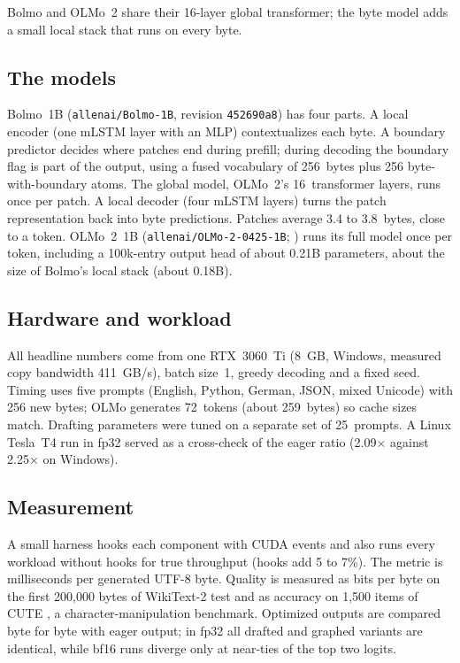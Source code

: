 \documentclass[11pt,a4paper]{article}
\newcommand{\x}{\ensuremath{\times}}
\begin{document}
Bolmo and OLMo~2 share their 16-layer global transformer; the byte model adds a small local stack that runs on every byte.

\subsection{The models}

Bolmo~1B (\texttt{allenai/Bolmo-1B}, revision \texttt{452690a8}) has four parts. A local encoder (one mLSTM layer \citep{beck2025xlstm} with an MLP) contextualizes each byte. A boundary predictor decides where patches end during prefill; during decoding the boundary flag is part of the output, using a fused vocabulary of 256~bytes plus 256 byte-with-boundary atoms. The global model, OLMo~2's 16~transformer layers, runs once per patch. A local decoder (four mLSTM layers) turns the patch representation back into byte predictions. Patches average 3.4 to 3.8~bytes, close to a token. OLMo~2~1B (\texttt{allenai/OLMo-2-0425-1B}; \citealp{walsh2025olmo2}) runs its full model once per token, including a 100k-entry output head of about 0.21B parameters, about the size of Bolmo's local stack (about 0.18B).

\subsection{Hardware and workload}

All headline numbers come from one RTX~3060~Ti (8~GB, Windows, measured copy bandwidth 411~GB/s), batch size~1, greedy decoding and a fixed seed. Timing uses five prompts (English, Python, German, JSON, mixed Unicode) with 256 new bytes; OLMo generates 72~tokens (about 259~bytes) so cache sizes match. Drafting parameters were tuned on a separate set of 25~prompts. A Linux Tesla~T4 run in fp32 served as a cross-check of the eager ratio (2.09\x{} against 2.25\x{} on Windows).

\subsection{Measurement}

A small harness hooks each component with CUDA events and also runs every workload without hooks for true throughput (hooks add 5 to 7\%). The metric is milliseconds per generated UTF-8 byte. Quality is measured as bits per byte on the first 200{,}000 bytes of WikiText-2 test and as accuracy on 1{,}500 items of CUTE \citep{edman2024cute}, a character-manipulation benchmark. Optimized outputs are compared byte for byte with eager output; in fp32 all drafted and graphed variants are identical, while bf16 runs diverge only at near-ties of the top two logits.
\end{document}
